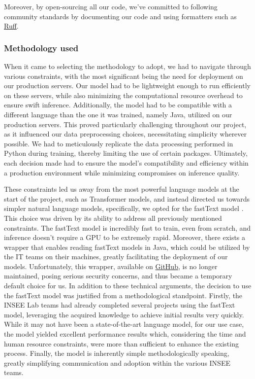 Moreover, by open-sourcing all our code, we've committed to following community standards by documenting our code and using formatters such as \href{https://github.com/astral-sh/ruff}{Ruff}.


\subsubsection{Methodology used}

When it came to selecting the methodology to adopt, we had to navigate through various constraints, with the most significant being the need for deployment on our production servers. Our model had to be lightweight enough to run efficiently on these servers, while also minimizing the computational resource overhead to ensure swift inference. Additionally, the model had to be compatible with a different language than the one it was trained, namely Java, utilized on our production servers. This proved particularly challenging throughout our project, as it influenced our data preprocessing choices, necessitating simplicity wherever possible. We had to meticulously replicate the data processing performed in Python during training, thereby limiting the use of certain packages. Ultimately, each decision made had to ensure the model's compatibility and efficiency within a production environment while minimizing compromises on inference quality.

These constraints led us away from the most powerful language models at the start of the project, such as Transformer models, and instead directed us towards simpler natural language models, specifically, we opted for the fastText model \cite{joulin2016bag}. This choice was driven by its ability to address all previously mentioned constraints. The fastText model is incredibly fast to train, even from scratch, and inference doesn't require a GPU to be extremely rapid. Moreover, there exists a wrapper that enables reading fastText models in Java, which could be utilized by the IT teams on their machines, greatly facilitating the deployment of our models. Unfortunately, this wrapper, available on \href{https://github.com/vinhkhuc/JFastText}{GitHub}, is no longer maintained, posing serious security concerns, and thus became a temporary default choice for us. In addition to these technical arguments, the decision to use the fastText model was justified from a methodological standpoint. Firstly, the INSEE Lab teams had already completed several projects using the fastText model, leveraging the acquired knowledge to achieve initial results very quickly. While it may not have been a state-of-the-art language model, for our use case, the model yielded excellent performance results which, considering the time and human resource constraints, were more than sufficient to enhance the existing process. Finally, the model is inherently simple methodologically speaking, greatly simplifying communication and adoption within the various INSEE teams. 

